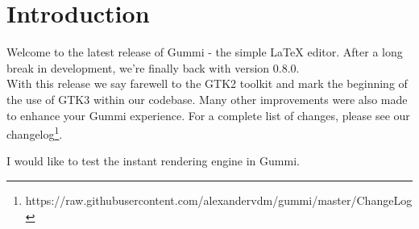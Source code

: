 \documentclass[11pt]{article}
\begin{document}
\thispagestyle{empty}

\section{Introduction}
Welcome to the latest release of Gummi - the simple {\LaTeX} editor. After a long break in development, we're finally back with version 0.8.0.\\
With this release we say farewell to the GTK2 toolkit and mark the beginning of the use of GTK3 within our codebase. Many other improvements were also made to enhance your Gummi experience. For a complete list of changes, please see our changelog\footnote{https://raw.githubusercontent.com/alexandervdm/gummi/master/ChangeLog}. 

I would like to test the instant rendering engine in Gummi.
\end{document}
